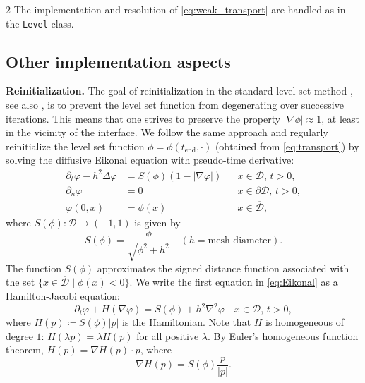 \documentclass[a4paper, oneside]{article}
\newcommand{\code}[1]{\texttt{#1}}
\begin{document}
\begin{multicols}{2}
The implementation and resolution of \eqref{eq:weak_transport} are handled
as in the \code{Level} class. 

\subsection{Other implementation aspects}\label{sub:other}

\textbf{Reinitialization.} 
The goal of reinitialization in the standard level set method \cite{MR965860}, see also \cite{MR3843884}, is to prevent the level set function from degenerating over successive iterations.
This means that one strives to preserve the property $|\nabla\phi|\approx 1$, at least in the vicinity of the interface.
We follow the same approach and regularly reinitialize the level set function $\phi = \phi(t_{\text{end}}, \cdot)$
(obtained from \eqref{eq:transport})
by solving the diffusive Eikonal equation with pseudo-time derivative:
\begin{equation} \label{eq:Eikonal}
\begin{aligned}
    \partial_t \varphi - h^2 \Delta \varphi &= S(\phi)(1 - |\nabla \varphi|)
    && x\in \mathcal{D},\, t>0, \\
    \partial_n \varphi &= 0
    && x\in \partial\mathcal{D},\, t>0, \\
	\varphi(0, x) &= \phi(x)
	&& x\in \overline{\mathcal{D}},
\end{aligned}
\end{equation}
where $S(\phi):\overline{\mathcal{D}}\rightarrow (-1, 1)$ is given by 
\begin{equation*}
	S(\phi) = \frac{\phi}{\sqrt{\phi^2 + h^2}}\quad (h= \text{mesh diameter}).
\end{equation*}
The function $S(\phi)$ approximates the signed distance function associated
with the set $\{x\in\overline{\mathcal{D}} \mid \phi(x)<0\}$.
We write the first equation in \eqref{eq:Eikonal}
as a Hamilton-Jacobi equation:
\begin{equation} \label{eq:HJ}
	\partial_t \varphi + H(\nabla \varphi) =
	S(\phi) + h^2 \nabla^2\varphi \quad x\in \mathcal{D},\, t>0,
\end{equation}
where $H(p) \coloneqq S(\phi) |p|$ is the Hamiltonian.
Note that $H$ is homogeneous of degree $1$: $H(\lambda p) = \lambda H(p)$
for all positive $\lambda$. By Euler's homogeneous function theorem,
$H(p) = \nabla H (p) \cdot p$, where
\begin{equation}\label{eq:grad_H}
	\nabla H (p) = S(\phi)\frac{p}{|p|}.
\end{equation}

\end{multicols}
\end{document}
